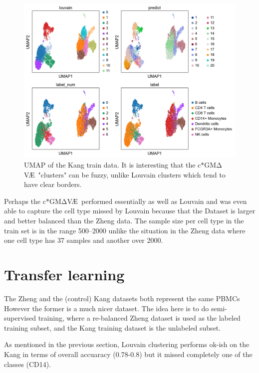 \documentclass[11pt, a4paper]{report}
\theoremstyle{plain}
\theoremstyle{definition}
\theoremstyle{remark}
\newcommand{\gmvae}{c$\ast$GM$\mathrm{\Delta}$V\AE~}
\begin{document}
\begin{figure}[h]
\centering
\includegraphics[width=1.1\textwidth]{images/gmmvae_Kang_control_train_us_21c_umap.png}
\caption{
UMAP of the Kang train data. It is interesting that the \gmvae "clusters" can be fuzzy,
unlike Louvain clusters which tend to have clear borders.
}
\label{fig:kang_control_train_gmvae_us_umap}
\end{figure}

Perhaps the \gmvae performed essentially as well as Louvain and was even able to
capture the cell type missed by Louvain because that the Dataset is larger and
better balanced than the Zheng data.
The sample size per cell type in the train set is in the range 500--2000 unlike
the situation in the Zheng data where one cell type has 37 samples and another
over 2000.

\section{Transfer learning}

The Zheng and the (control) Kang datasets both represent the same PBMCs
However the former is a much nicer dataset.
The idea here is to do semi-supervised training, where a re-balanced Zheng
dataset is used as the labeled training subset, and the Kang training dataset is the
unlabeled subset.

As mentioned in the previous section, Louvain clustering performs ok-ish on the
Kang in terms of overall accuaracy (0.78-0.8) but it missed completely
one of the classes (CD14).
\end{document}
